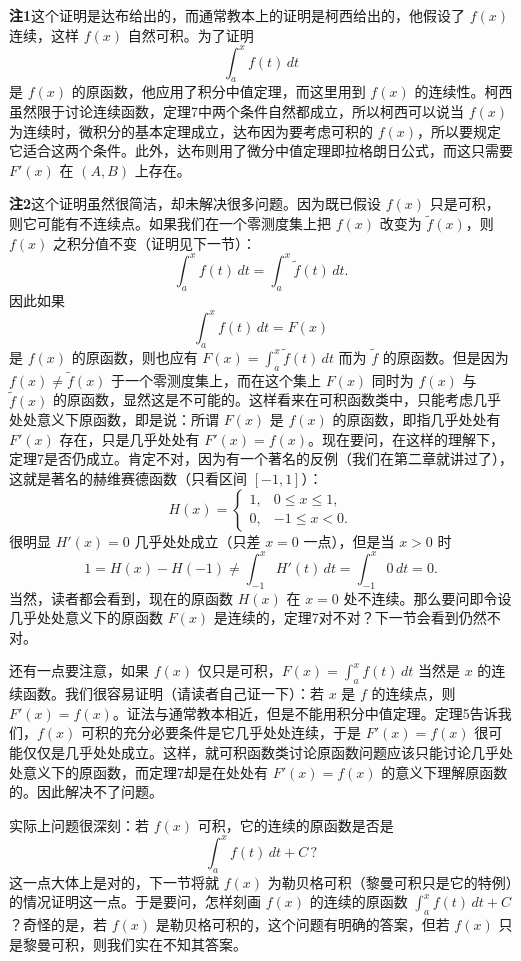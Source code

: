 
\noindent\textbf{注1}\quad 这个证明是达布给出的，而通常教本上的证明是柯西给出的，他假设了 $f(x)$ 连续，这样 $f(x)$ 自然可积。为了证明
\[
 \int_a^x f(t)\,dt
\]
是 $f(x)$ 的原函数，他应用了积分中值定理，而这里用到 $f(x)$ 的连续性。柯西虽然限于讨论连续函数，定理7中两个条件自然都成立，所以柯西可以说当 $f(x)$ 为连续时，微积分的基本定理成立，达布因为要考虑可积的 $f(x)$，所以要规定它适合这两个条件。此外，达布则用了微分中值定理即拉格朗日公式，而这只需要 $F'(x)$ 在 $(A,B)$ 上存在。

\noindent\textbf{注2}\quad 这个证明虽然很简洁，却未解决很多问题。因为既已假设 $f(x)$ 只是可积，则它可能有不连续点。如果我们在一个零测度集上把 $f(x)$ 改变为 $\widetilde f(x)$，则 $f(x)$ 之积分值不变（证明见下一节）：
\[
 \int_a^x f(t)\,dt=\int_a^x \widetilde f(t)\,dt.
\]
因此如果
\[
 \int_a^x f(t)\,dt=F(x)
\]
是 $f(x)$ 的原函数，则也应有 $F(x)=\int_a^x\widetilde f(t)\,dt$ 而为 $\widetilde f$ 的原函数。但是因为 $f(x)\ne\widetilde f(x)$ 于一个零测度集上，而在这个集上 $F(x)$ 同时为 $f(x)$ 与 $\widetilde f(x)$ 的原函数，显然这是不可能的。这样看来在可积函数类中，只能考虑几乎处处意义下原函数，即是说：所谓 $F(x)$ 是 $f(x)$ 的原函数，即指几乎处处有 $F'(x)$ 存在，只是几乎处处有 $F'(x)=f(x)$。现在要问，在这样的理解下，定理7是否仍成立。肯定不对，因为有一个著名的反例（我们在第二章就讲过了），这就是著名的赫维赛德函数（只看区间 $[-1,1]$）：
\[
 H(x)=\begin{cases}
 1,&0\le x\le1,\\
 0,&-1\le x<0.
 \end{cases}
\]
很明显 $H'(x)=0$ 几乎处处成立（只差 $x=0$ 一点），但是当 $x>0$ 时
\[
 1=H(x)-H(-1)\ne\int_{-1}^{x}H'(t)\,dt=\int_{-1}^{x}0\,dt=0.
\]
当然，读者都会看到，现在的原函数 $H(x)$ 在 $x=0$ 处不连续。那么要问即令设几乎处处意义下的原函数 $F(x)$ 是连续的，定理7对不对？下一节会看到仍然不对。

还有一点要注意，如果 $f(x)$ 仅只是可积，$F(x)=\int_a^x f(t)\,dt$ 当然是 $x$ 的连续函数。我们很容易证明（请读者自己证一下）：若 $x$ 是 $f$ 的连续点，则 $F'(x)=f(x)$。证法与通常教本相近，但是不能用积分中值定理。定理5告诉我们，$f(x)$ 可积的充分必要条件是它几乎处处连续，于是 $F'(x)=f(x)$ 很可能仅仅是几乎处处成立。这样，就可积函数类讨论原函数问题应该只能讨论几乎处处意义下的原函数，而定理7却是在处处有 $F'(x)=f(x)$ 的意义下理解原函数的。因此解决不了问题。

实际上问题很深刻：若 $f(x)$ 可积，它的连续的原函数是否是
\[
 \int_a^x f(t)\,dt+C\,?
\]
这一点大体上是对的，下一节将就 $f(x)$ 为勒贝格可积（黎曼可积只是它的特例）的情况证明这一点。于是要问，怎样刻画 $f(x)$ 的连续的原函数 $\int_a^x f(t)\,dt+C$？奇怪的是，若 $f(x)$ 是勒贝格可积的，这个问题有明确的答案，但若 $f(x)$ 只是黎曼可积，则我们实在不知其答案。


